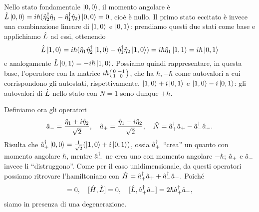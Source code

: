 Nello stato fondamentale $\left|{0,0}\right\rangle$, il momento angolare è $\hat{L}\left|{0,0}\right\rangle=i\hbar({\hat{\eta}_2}^\dagger\hat{\eta}_1-{\hat{\eta}_1}^\dagger\hat{\eta}_2)\left|{0,0}\right\rangle=0$, cioè è nullo.
Il primo stato eccitato è invece una combinazione lineare di $\left|{1,0}\right\rangle$ e $\left|{0,1}\right\rangle$: prendiamo questi due stati come base e applichiamo $\hat{L}$ ad essi, ottenendo
\begin{equation}
	\hat{L}\left|{1,0}\right\rangle=i\hbar(\hat{\eta}_1{\hat{\eta}_2}^\dagger\left|{1,0}\right\rangle-{\hat{\eta}_1}^\dagger\hat{\eta}_2\left|{1,0}\right\rangle)=i\hbar\hat{\eta}_1\left|{1,1}\right\rangle=i\hbar\left|{0,1}\right\rangle
\end{equation}
e analogamente $\hat{L}\left|{0,1}\right\rangle=-i\hbar\left|{1,0}\right\rangle$.
Possiamo quindi rappresentare, in questa base, l'operatore con la matrice $i\hbar\begin{psmallmatrix}0&-1\\1&0\end{psmallmatrix}$, che ha $\hbar,-\hbar$ come autovalori a cui corrispondono gli autostati, rispettivamente, $\left|{1,0}\right\rangle+i\left|{0,1}\right\rangle$ e $\left|{1,0}\right\rangle-i\left|{0,1}\right\rangle$: gli autovalori di $\hat{L}$ nello stato con $N=1$ sono dunque $\pm\hbar$.

Definiamo ora gli operatori
\begin{equation}
	\hat{a}_-=\frac{\hat{\eta}_1+i\hat{\eta}_2}{\sqrt{2}},\quad\hat{a}_+=\frac{\hat{\eta}_1-i\hat{\eta}_2}{\sqrt{2}},\quad\hat{N}={\hat{a}_+}^\dagger\hat{a}_+-{\hat{a}_-}^\dagger\hat{a}_-.
\end{equation}
Risulta che ${\hat{a}_+}^\dagger\left|{0,0}\right\rangle=\frac1{\sqrt{2}}(\left|{1,0}\right\rangle+i\left|{0,1}\right\rangle)$, ossia ${\hat{a}_+}^\dagger$ ``crea'' un quanto con momento angolare $\hbar$, mentre ${\hat{a}_-}^\dagger$ ne crea uno con momento angolare $-\hbar$; $\hat{a}_+$ e $\hat{a}_-$ invece li ``distruggono''.
Come per il caso unidimensionale, da questi operatori possiamo ritrovare l'hamiltoniano con $\hat{H}={\hat{a}_+}^\dagger\hat{a}_++{\hat{a}_-}^\dagger\hat{a}_-$.
Poich\'e
\begin{equation}
	[\op H,\adj{\op a_+}\op a_-]=0,\quad [\op H,\op L]=0,\quad [\op L,\adj{\op a_+}\op a_-]=2\hbar\adj{\op a_+}\op a_-,
\end{equation}
siamo in presenza di una degenerazione.

